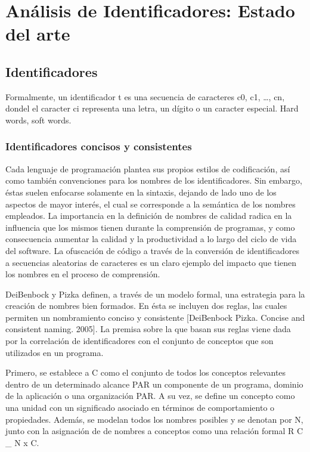 \chapter{Análisis de Identificadores: Estado del arte}

\section{Identificadores}
Formalmente, un identificador t es una secuencia de caracteres c0, c1, …, cn, dondel el caracter ci representa una letra, un dígito o un caracter especial. Hard words, soft words.

\subsection{Identificadores concisos y consistentes}
Cada lenguaje de programación plantea sus propios estilos de codificación, así como también convenciones para los nombres de los identificadores. Sin embargo, éstas suelen enfocarse solamente en la sintaxis, dejando de lado uno de los aspectos de mayor interés, el cual se corresponde a la semántica de los nombres empleados. La importancia en la definición de nombres de calidad radica en la influencia que los mismos tienen durante la comprensión de programas, y como consecuencia aumentar la calidad y la productividad a lo largo del ciclo de vida del software. La ofuscación de código a través de la conversión de identificadores a secuencias aleatorias de caracteres es un claro ejemplo del impacto que tienen los nombres en el proceso de comprensión.

DeiBenbock y Pizka definen, a través de un modelo formal, una estrategia para la creación de nombres bien formados. En ésta se incluyen dos reglas, las cuales permiten un nombramiento conciso y consistente [DeiBenbock Pizka. Concise and consistent naming. 2005]. La premisa sobre la que basan sus reglas viene dada por la correlación de identificadores con el conjunto de conceptos que son utilizados en un programa.

Primero, se establece a C como el conjunto de todos los conceptos relevantes dentro de un determinado alcance PAR un componente de un programa, dominio de la aplicación o una organización PAR. A su vez, se define un concepto como una unidad con un significado asociado en términos de comportamiento o propiedades. Además, se modelan todos los nombres posibles y se denotan por N, junto con la asignación de de nombres a conceptos como una relación formal R C \_ N x C.

